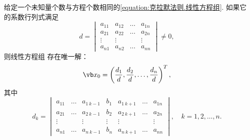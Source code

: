 \begin{theorem}[克拉默法则]\label{theorem:线性方程组.克拉默法则}
给定一个未知量个数与方程个数相同的\cref{equation:克拉默法则.线性方程组}.
如果它的系数行列式满足\[
	d
	=\begin{vmatrix}
		a_{11} & a_{12} & \dots & a_{1n} \\
		a_{21} & a_{22} & \dots & a_{2n} \\
		\vdots & \vdots & & \vdots \\
		a_{n1} & a_{n2} & \dots & a_{nn}
	\end{vmatrix}
	\neq 0,
\]
则线性方程组  存在唯一解：
\begin{equation}
	\x_0
	= \left( \frac{d_1}{d},\frac{d_2}{d},\dotsc,\frac{d_n}{d} \right)^T,
\end{equation}
其中\begin{equation}
	d_k
	= \begin{vmatrix}
		a_{11} & \dots & a_{1\ k-1} & b_1 & a_{1\ k+1} & \dots & a_{1n} \\
		a_{21} & \dots & a_{2\ k-1} & b_2 & a_{2\ k+1} & \dots & a_{2n} \\
		\vdots & & \vdots & \vdots & \vdots & & \vdots \\
		a_{n1} & \dots & a_{n\ k-1} & b_n & a_{n\ k+1} & \dots & a_{nn}
	\end{vmatrix},
	\quad k=1,2,\dotsc,n.
\end{equation}
\end{theorem}
